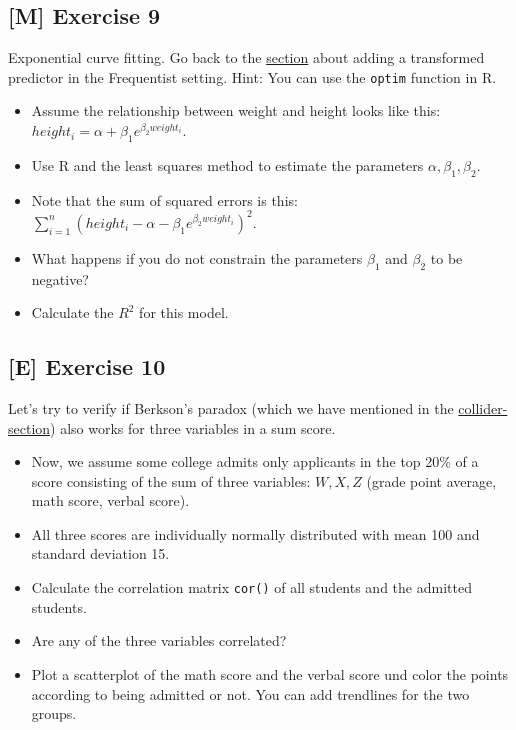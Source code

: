 \documentclass[
]{book}
\providecommand{\tightlist}{%
  \setlength{\itemsep}{0pt}\setlength{\parskip}{0pt}}
\begin{document}
\subsection{{[}M{]} Exercise 9}\label{exercise9_multiple_regression}

Exponential curve fitting. Go back to the \hyperref[adding_transformed_predictor_freq]{section} about adding a transformed predictor in the Frequentist
setting. Hint: You can use the \texttt{optim} function in R.

\begin{itemize}
\tightlist
\item
  Assume the relationship between weight and height looks like this:
  \(height_i = \alpha + \beta_1 e^{\beta_2 weight_i}\).
\item
  Use R and the least squares method to estimate the parameters \(\alpha, \beta_1, \beta_2\).
\item
  Note that the sum of squared errors is this:
  \(\sum_{i=1}^n (height_i - \alpha - \beta_1 e^{\beta_2 weight_i})^2\).
\item
  What happens if you do not constrain the parameters \(\beta_1\) and \(\beta_2\) to be negative?
\item
  Calculate the \(R^2\) for this model.
\end{itemize}

\subsection{{[}E{]} Exercise 10}\label{exercise10_multiple_regression}

Let's try to verify if Berkson's paradox (which we have mentioned in the
\hyperref[collider]{collider-section}) also works for three variables in a sum score.

\begin{itemize}
\tightlist
\item
  Now, we assume some college admits only applicants in the top 20\% of a score
  consisting of the sum of three variables: \(W, X, Z\) (grade point average, math score, verbal score).
\item
  All three scores are individually normally distributed with mean 100 and standard deviation 15.
\item
  Calculate the correlation matrix \texttt{cor()} of all students and the admitted students.
\item
  Are any of the three variables correlated?
\item
  Plot a scatterplot of the math score and the verbal score und color the points according
  to being admitted or not. You can add trendlines for the two groups.
\end{itemize}
\end{document}
